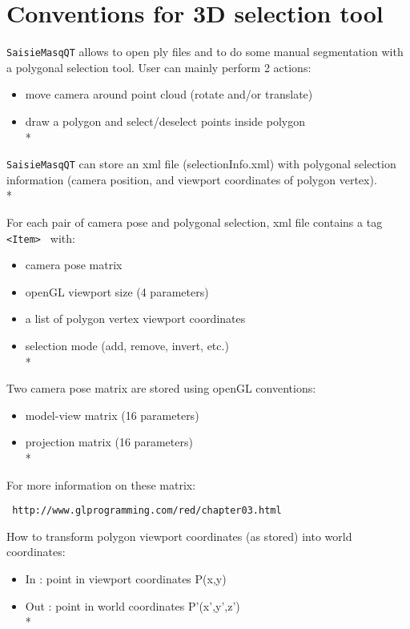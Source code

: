 

\section{Conventions for 3D selection tool}

{\tt SaisieMasqQT} allows to open ply files and to do some manual segmentation with a polygonal selection tool.
User can mainly perform 2 actions:
\begin{itemize}
\item move camera around point cloud (rotate and/or translate)
\item draw a polygon and select/deselect points inside polygon\\*
\end{itemize}

{\tt SaisieMasqQT} can store an xml file (selectionInfo.xml) with polygonal selection information (camera position, and viewport coordinates of polygon vertex).\\*

For each pair of camera pose and polygonal selection, xml file contains a tag {\tt <Item> } with:
\begin{itemize}
\item camera pose matrix 
\item openGL viewport size (4 parameters)
\item a list of polygon vertex viewport coordinates
\item selection mode (add, remove, invert, etc.)\\*
\end{itemize} 

Two camera pose matrix are stored using openGL conventions:

\begin{itemize}
\item model-view matrix (16 parameters)
\item projection matrix (16 parameters)\\*
\end{itemize}

For more information on these matrix: 

\begin{verbatim} http://www.glprogramming.com/red/chapter03.html \end{verbatim}

How to transform polygon viewport coordinates (as stored) into world coordinates:

\begin{itemize}
\item In  : point in viewport coordinates P(x,y)
\item Out : point in world coordinates P'(x',y',z')\\*
\end{itemize}

